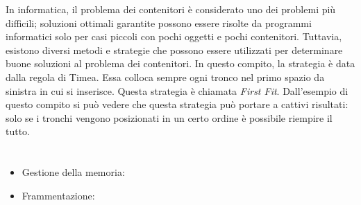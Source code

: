 {{In informatica, il problema dei contenitori è considerato uno dei problemi più difficili; soluzioni ottimali garantite possono essere risolte da programmi informatici solo per casi piccoli con pochi oggetti e pochi contenitori. Tuttavia, esistono diversi metodi e strategie che possono essere utilizzati per determinare buone soluzioni al problema dei contenitori. In questo compito, la strategia è data dalla regola di Timea. Essa colloca sempre ogni tronco nel primo spazio da sinistra in cui si inserisce. Questa strategia è chiamata \emph{First Fit}. Dall’esempio di questo compito si può vedere che questa strategia può portare a cattivi risultati: solo se i tronchi vengono posizionati in un certo ordine è possibile riempire il tutto.



\section*{\BrochureWebsitesAndKeywords}
{\raggedright
\begin{itemize}
  \item Gestione della memoria: \href{https://it.wikipedia.org/wiki/Gestione_della_memoria}{}
  \item Frammentazione: \href{https://it.wikipedia.org/wiki/Frammentazione_(informatica)}{}
\end{itemize}


}

}{}

\def\AuthorPelletJ{} %
\def\AuthorDatzkoThutS{} %
\def\AuthorDasovicD{} %
\def\AuthorBaumannL{} %
\def\AuthorGiangC{} %

\newpage}{}
